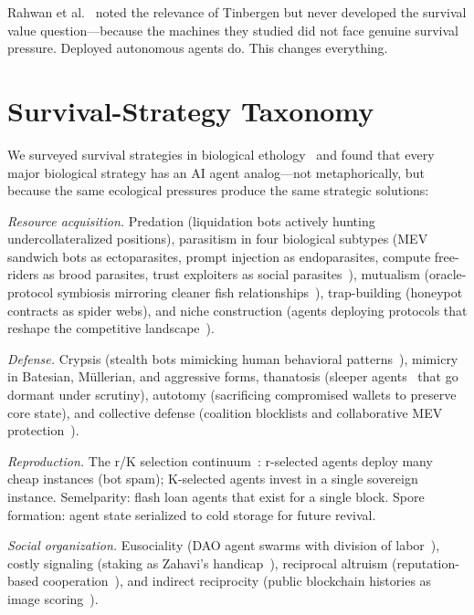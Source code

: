 \documentclass[letterpaper]{article}
\begin{document}
Rahwan et al.~\citep{rahwan2019machine} noted the relevance of Tinbergen but never developed the survival value question---because the machines they studied did not face genuine survival pressure. Deployed autonomous agents do. This changes everything.

\section{Survival-Strategy Taxonomy}

We surveyed survival strategies in biological ethology~\citep{krebs1993behavioural, dawkins1982extended, stearns1992evolution, ruxton2018avoiding} and found that every major biological strategy has an AI agent analog---not metaphorically, but because the same ecological pressures produce the same strategic solutions:

\emph{Resource acquisition.} Predation (liquidation bots actively hunting undercollateralized positions), parasitism in four biological subtypes (MEV sandwich bots as ectoparasites, prompt injection as endoparasites, compute free-riders as brood parasites, trust exploiters as social parasites~\citep{daian2020flash, dawkins1982extended}), mutualism (oracle-protocol symbiosis mirroring cleaner fish relationships~\citep{noe1994biological}), trap-building (honeypot contracts as spider webs), and niche construction (agents deploying protocols that reshape the competitive landscape~\citep{odlingsmee2003niche}).

\emph{Defense.} Crypsis (stealth bots mimicking human behavioral patterns~\citep{ruxton2018avoiding}), mimicry in Batesian, M\"ullerian, and aggressive forms, thanatosis (sleeper agents~\citep{hubinger2024sleeper} that go dormant under scrutiny), autotomy (sacrificing compromised wallets to preserve core state), and collective defense (coalition blocklists and collaborative MEV protection~\citep{wilson1975sociobiology}).

\emph{Reproduction.} The r/K selection continuum~\citep{stearns1992evolution}: r-selected agents deploy many cheap instances (bot spam); K-selected agents invest in a single sovereign instance. Semelparity: flash loan agents that exist for a single block. Spore formation: agent state serialized to cold storage for future revival.

\emph{Social organization.} Eusociality (DAO agent swarms with division of labor~\citep{wilson1975sociobiology}), costly signaling (staking as Zahavi's handicap~\citep{zahavi1975mate}), reciprocal altruism (reputation-based cooperation~\citep{axelrod1984evolution}), and indirect reciprocity (public blockchain histories as image scoring~\citep{nowak1998evolution}).
\end{document}

